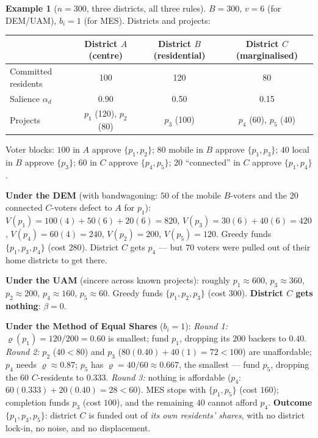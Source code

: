 \documentclass[11pt,letterpaper]{article}
\theoremstyle{definition}
\newtheorem{example}{Example}[section]
\theoremstyle{plain}
\theoremstyle{remark}
\newcommand{\votes}{v}
\newcommand{\budget}{B}
\newcommand{\mesrho}{\varrho}      %
\newcommand{\salience}{\alpha}
\begin{document}
\begin{example}[$n=300$, three districts, all three rules]
\label{ex:300}
$\budget=300$, $\votes=6$ (for DEM/UAM), $b_i=1$ (for MES). Districts and projects:
\begin{center}\small
\begin{tabular}{lccc}
\toprule
 & District $A$ (centre) & District $B$ (residential) & District $C$ (marginalised)\\
\midrule
Committed residents & 100 & 120 & 80\\
Salience $\salience_d$ & 0.90 & 0.50 & 0.15\\
Projects & $p_1$ (120), $p_2$ (80) & $p_3$ (100) & $p_4$ (60), $p_5$ (40)\\
\bottomrule
\end{tabular}
\end{center}
Voter blocks: $100$ in $A$ approve $\{p_1,p_2\}$; $80$ mobile in $B$ approve $\{p_1,p_3\}$; $40$
local in $B$ approve $\{p_3\}$; $60$ in $C$ approve $\{p_4,p_5\}$; $20$ ``connected'' in $C$ approve
$\{p_1,p_4\}$.

\medskip\noindent\textbf{Under the DEM} (with bandwagoning: $50$ of the mobile $B$-voters and the
$20$ connected $C$-voters defect to $A$ for $p_1$):
$V(p_1)=100(4)+50(6)+20(6)=820$, $V(p_3)=30(6)+40(6)=420$, $V(p_4)=60(4)=240$, $V(p_2)=200$,
$V(p_5)=120$. Greedy funds $\{p_1,p_3,p_4\}$ (cost $280$). District $C$ gets $p_4$ --- but $70$ voters
were pulled out of their home districts to get there.

\medskip\noindent\textbf{Under the UAM} (sincere across known projects): roughly $p_1\approx600$,
$p_3\approx360$, $p_2\approx200$, $p_4\approx160$, $p_5\approx60$. Greedy funds $\{p_1,p_2,p_3\}$
(cost $300$). \textbf{District $C$ gets nothing}: $\beta=0$.

\medskip\noindent\textbf{Under the Method of Equal Shares} ($b_i=1$):
\emph{Round 1:} $\mesrho(p_1)=120/200=0.60$ is smallest; fund $p_1$, dropping its $200$ backers to
$0.40$.
\emph{Round 2:} $p_2$ ($40<80$) and $p_3$ ($80(0.40)+40(1)=72<100$) are unaffordable; $p_4$ needs
$\mesrho\approx0.87$; $p_5$ has $\mesrho=40/60\approx0.667$, the smallest --- fund $p_5$, dropping the
$60$ $C$-residents to $0.333$.
\emph{Round 3:} nothing is affordable ($p_4$: $60(0.333)+20(0.40)=28<60$). MES stops with
$\{p_1,p_5\}$ (cost $160$); completion funds $p_3$ (cost $100$), and the remaining $40$ cannot afford
$p_4$. \textbf{Outcome $\{p_1,p_3,p_5\}$}: district $C$ is funded out of \emph{its own residents'
shares}, with no district lock-in, no noise, and no displacement.


\end{example}
\end{document}
